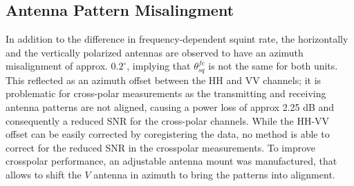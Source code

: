 \subsection{Antenna Pattern Misalingment}\label{sec:misalingment}
In addition to the difference in frequency-dependent squint rate, the horizontally and the vertically polarized antennas are observed to have an azimuth misalignment of approx. $0.2^\circ$,
implying that $\theta_{sq}^{fc}$ is not the same for both units. This reflected as an azimuth offset between the HH and VV channels; it is problematic for cross-polar measurements as the transmitting and receiving antenna patterns are not aligned, causing a power loss of approx 2.25 dB and consequently a reduced SNR for the cross-polar channels. While the HH-VV offset can be easily corrected by coregistering the data, no method is able to correct for the reduced SNR in the crosspolar measurements. To improve crosspolar performance, an adjustable antenna mount was manufactured, that allows to shift the $V$ antenna in azimuth to bring the patterns into alignment.\\
